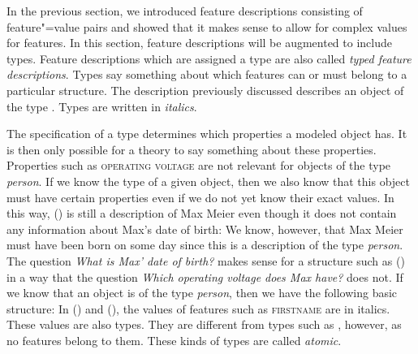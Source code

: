 \addlines
In the previous section, we introduced feature descriptions consisting of feature"=value pairs and showed that it makes sense to allow for
complex values for features. In this section, feature descriptions will be augmented to include types. Feature descriptions which are assigned a type
are also called \emph{typed feature descriptions}. Types say something about which features can or must belong to a 
particular structure. The description previously discussed describes an object of the type .
\ea
{}
\z
Types are written in \textit{italics}. 

The specification of a type determines which properties a modeled object has. It is then only
possible for a theory to say something about these properties.
Properties such as \textsc{operating voltage} are not relevant for objects of the type \textit{person}. If we know the type of a given object, then we
also know that this object must have certain properties even if we do not yet know their exact values. In this way, () is still a description of
Max Meier even though it does not contain any information about Max's date of birth:
\ea
{}
\z
We know, however, that Max Meier must have been born on some day since this is a description of the type \textit{person}.
The question \emph{What is Max' date of birth?} makes sense for a structure such as () in a way that the question
\emph{Which operating voltage does Max have?} does not. If we know that an object is of the type \textit{person}, then we have
the following basic structure:
\ea
{}
\z
In () and (), the values of features such as \textsc{firstname} are in italics. These values are also types. They are different from
types such as , however, as no features belong to them. These kinds of types are called \emph{atomic}.

